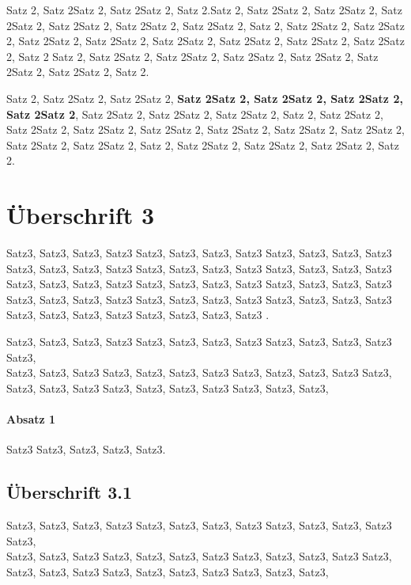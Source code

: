 \documentclass[pdftex, a4paper]{scrartcl}
\begin{document}
    Satz 2, Satz 2Satz 2, Satz 2Satz 2, Satz 2.Satz 2, Satz 2Satz 2, Satz 2Satz 2, Satz 2Satz 2, Satz 2Satz 2, Satz 2Satz 2, Satz 2Satz 2, 
    Satz 2, Satz 2Satz 2, Satz 2Satz 2, Satz 2Satz 2, Satz 2Satz 2, Satz 2Satz 2, Satz 2Satz 2, Satz 2Satz 2, Satz 2Satz 2, Satz 2
    Satz 2, Satz 2Satz 2, Satz 2Satz 2, Satz 2Satz 2, Satz 2Satz 2, Satz 2Satz 2, Satz 2Satz 2, Satz 2.


    Satz 2, Satz 2Satz 2, Satz 2Satz 2,  \textbf{Satz 2Satz 2, Satz 2Satz 2, Satz 2Satz 2, Satz 2Satz 2}, Satz 2Satz 2, Satz 2Satz 2, Satz 2Satz 2,
    Satz 2, Satz 2Satz 2, Satz 2Satz 2, Satz 2Satz 2, Satz 2Satz 2, Satz 2Satz 2, Satz 2Satz 2, Satz 2Satz 2, Satz 2Satz 2, Satz 2Satz 2, 
    Satz 2, Satz 2Satz 2, Satz 2Satz 2, Satz 2Satz 2, Satz 2.

    \section{Überschrift 3}

    Satz3, Satz3, Satz3, Satz3 Satz3, Satz3, Satz3, Satz3 Satz3, Satz3, Satz3, Satz3 Satz3, Satz3, Satz3, Satz3 Satz3, Satz3, Satz3, Satz3 
    Satz3, Satz3, Satz3, Satz3 Satz3, Satz3, Satz3, Satz3 Satz3, Satz3, Satz3, Satz3 Satz3, Satz3, Satz3, Satz3 Satz3, Satz3, Satz3, Satz3 
    Satz3, Satz3, Satz3, Satz3 Satz3, Satz3, Satz3, Satz3 Satz3, Satz3, Satz3, Satz3 Satz3, Satz3, Satz3, Satz3 .


    Satz3, Satz3, Satz3, Satz3 Satz3, Satz3, Satz3, Satz3 Satz3, Satz3, Satz3, Satz3 Satz3, \\
    Satz3, Satz3, Satz3 Satz3, Satz3, Satz3, Satz3 
    Satz3, Satz3, Satz3, Satz3 Satz3, Satz3, Satz3, Satz3 Satz3, Satz3, Satz3, Satz3 Satz3, Satz3, Satz3,
    
    \paragraph*{Absatz 1}
    Satz3 Satz3, Satz3, Satz3, Satz3.

    \subsection{Überschrift 3.1}
    Satz3, Satz3, Satz3, Satz3 Satz3, Satz3, Satz3, Satz3 Satz3, Satz3, Satz3, Satz3 Satz3, \\
    Satz3, Satz3, Satz3 Satz3, Satz3, Satz3, Satz3 
    Satz3, Satz3, Satz3, Satz3 Satz3, Satz3, Satz3, Satz3 Satz3, Satz3, Satz3, Satz3 Satz3, Satz3, Satz3,
\end{document}
